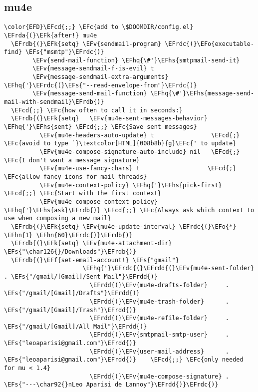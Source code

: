 \documentclass[c]{article}
\theoremstyle{plain}%
\theoremstyle{definition}
\theoremstyle{remark}
\newcommand{\EFc}[1]{\textcolor{EFc}{#1}} %
\newcommand{\EFcd}[1]{\textcolor{EFcd}{#1}} %
\newcommand{\EFs}[1]{\textcolor{EFs}{#1}} %
\newcommand{\EFk}[1]{\textcolor{EFk}{#1}} %
\newcommand{\EFf}[1]{\textcolor{EFf}{#1}} %
\newcommand{\EFv}[1]{\textcolor{EFv}{#1}} %
\newcommand{\EFo}[1]{\textcolor{EFo}{#1}} %
\newcommand{\EFhn}[1]{\textcolor{EFhn}{#1}} %
\newcommand{\EFhq}[1]{\textcolor{EFhq}{#1}} %
\newcommand{\EFhs}[1]{\textcolor{EFhs}{#1}} %
\newcommand{\EFrda}[1]{\textcolor{EFrda}{#1}} %
\newcommand{\EFrdb}[1]{\textcolor{EFrdb}{#1}} %
\newcommand{\EFrdc}[1]{\textcolor{EFrdc}{#1}} %
\newcommand{\EFrdd}[1]{\textcolor{EFrdd}{#1}} %
\begin{document}
\subsection{mu4e}
\label{sec:org98dea11}
\begin{Code}
\begin{Verbatim}
\color{EFD}\EFcd{;;} \EFc{add to \$DOOMDIR/config.el}
\EFrda{(}\EFk{after!} mu4e
  \EFrdb{(}\EFk{setq} \EFv{sendmail-program} \EFrdc{(}\EFo{executable-find} \EFs{"msmtp"}\EFrdc{)}
        \EFv{send-mail-function} \EFhq{\#'}\EFhs{smtpmail-send-it}
        \EFv{message-sendmail-f-is-evil} t
        \EFv{message-sendmail-extra-arguments} \EFhq{'}\EFrdc{(}\EFs{"--read-envelope-from"}\EFrdc{)}
        \EFv{message-send-mail-function} \EFhq{\#'}\EFhs{message-send-mail-with-sendmail}\EFrdb{)}
  \EFcd{;;} \EFc{how often to call it in seconds:}
  \EFrdb{(}\EFk{setq}   \EFv{mu4e-sent-messages-behavior} \EFhq{'}\EFhs{sent} \EFcd{;;} \EFc{Save sent messages}
          \EFv{mu4e-headers-auto-update} t                \EFcd{;} \EFc{avoid to type `}\textcolor[HTML]{008b8b}{g}\EFc{' to update}
          \EFv{mu4e-compose-signature-auto-include} nil   \EFcd{;} \EFc{I don't want a message signature}
          \EFv{mu4e-use-fancy-chars} t                   \EFcd{;} \EFc{allow fancy icons for mail threads}
          \EFv{mu4e-context-policy} \EFhq{'}\EFhs{pick-first}   \EFcd{;;} \EFc{Start with the first context}
          \EFv{mu4e-compose-context-policy} \EFhq{'}\EFhs{ask}\EFrdb{)} \EFcd{;;} \EFc{Always ask which context to use when composing a new mail}
  \EFrdb{(}\EFk{setq} \EFv{mu4e-update-interval} \EFrdc{(}\EFo{*} \EFhn{1} \EFhn{60}\EFrdc{)}\EFrdb{)}
  \EFrdb{(}\EFk{setq} \EFv{mu4e-attachment-dir} \EFs{"\char126{}/Downloads"}\EFrdb{)}
  \EFrdb{(}\EFf{set-email-account!} \EFs{"gmail"}
                      \EFhq{'}\EFrdc{(}\EFrdd{(}\EFv{mu4e-sent-folder}       . \EFs{"/gmail/[Gmail]/Sent Mail"}\EFrdd{)}
                        \EFrdd{(}\EFv{mu4e-drafts-folder}     . \EFs{"/gmail/[Gmail]/Drafts"}\EFrdd{)}
                        \EFrdd{(}\EFv{mu4e-trash-folder}      . \EFs{"/gmail/[Gmail]/Trash"}\EFrdd{)}
                        \EFrdd{(}\EFv{mu4e-refile-folder}     . \EFs{"/gmail/[Gmail]/All Mail"}\EFrdd{)}
                        \EFrdd{(}\EFv{smtpmail-smtp-user}     . \EFs{"leoaparisi@gmail.com"}\EFrdd{)}
                        \EFrdd{(}\EFv{user-mail-address}      . \EFs{"leoaparisi@gmail.com"}\EFrdd{)}    \EFcd{;;} \EFc{only needed for mu < 1.4}
                        \EFrdd{(}\EFv{mu4e-compose-signature} . \EFs{"---\char92{}nLeo Aparisi de Lannoy"}\EFrdd{)}\EFrdc{)}

\end{Verbatim}
\end{Code}
\end{document}
